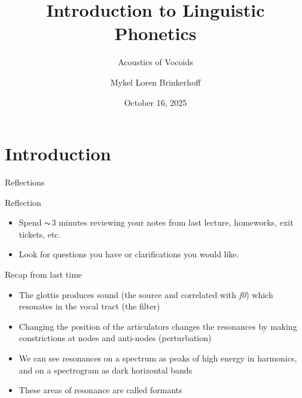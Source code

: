 \documentclass[professionalfonts]{beamer}
\title[LING 450/550] %
{Introduction to Linguistic Phonetics}
\subtitle{Acoustics of Vocoids}
\author[Brinkerhoff] %
{Mykel Loren Brinkerhoff}
\institute[UW] %
{University of Washington}
\date[2025-10-16] %
{October 16, 2025}
\begin{document}
\begin{frame}
    \titlepage
\end{frame}

\section{Introduction}

    

\begin{frame}{Reflections}
    \begin{block}{Reflection}
        \begin{itemize}
            \item Spend $\thicksim$3 minutes reviewing your notes from last lecture, homeworks, exit tickets, etc.
            \item Look for questions you have or clarifications you would like. 
        \end{itemize}
    \end{block}
\end{frame}

\begin{frame}{Recap from last time}
    \begin{itemize}
        \item The glottis produces sound (the source and correlated with \textit{f0}) which resonates in the vocal tract (the filter) 
        \item Changing the position of the articulators changes the resonances by making constrictions at nodes and anti-nodes (perturbation)
        \item We can see resonances on a spectrum as peaks of high energy in harmonics, and on a spectrogram as dark horizontal bands
        \item These areas of resonance are called formants
    \end{itemize}
\end{frame}
\end{document}

